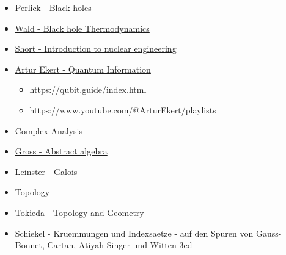 \documentclass[10pt,a4paper]{book}
\theoremstyle{definition}
\begin{document}
\begin{itemize}
\item \href{https://www.youtube.com/watch?v=3JhwuqEdyXM&list=PLaNkJORnlhZl6XY824eq9D2x6JoLwwpyr}{Perlick - Black holes}
\item \href{https://www.youtube.com/watch?v=Ssmr057FLEE}{Wald - Black hole Thermodynamics}

\item \href{https://ocw.mit.edu/courses/22-01-introduction-to-nuclear-engineering-and-ionizing-radiation-fall-2016/video_galleries/lecture-videos/}{Short - Introduction to nuclear engineering}

\item \href{https://www.arturekert.org/iqis}{Artur Ekert - Quantum Information}
\begin{itemize}
\item https://qubit.guide/index.html
\item https://www.youtube.com/@ArturEkert/playlists
\end{itemize}
\item \href{https://www.youtube.com/@StokesLine}{Complex Analysis}
\item \href{https://www.youtube.com/watch?v=VdLhQs_y_E8&list=PLelIK3uylPMGzHBuR3hLMHrYfMqWWsmx5}{Gross - Abstract algebra}
\item \href{https://www.maths.ed.ac.uk/~tl/gt/gt.pdf}{Leinster - Galois}
\item \href{http://www.math.toronto.edu/ivan/mat327/?resources}{Topology}
\item \href{https://www.youtube.com/watch?v=SXHHvoaSctc&list=PLTBqohhFNBE_09L0i-lf3fYXF5woAbrzJ}{Tokieda - Topology and Geometry}
\item Schiekel - Kruemmungen und Indexsaetze - auf den Spuren von Gauss-Bonnet, Cartan, Atiyah-Singer und Witten 3ed

\end{itemize}
\end{document}
